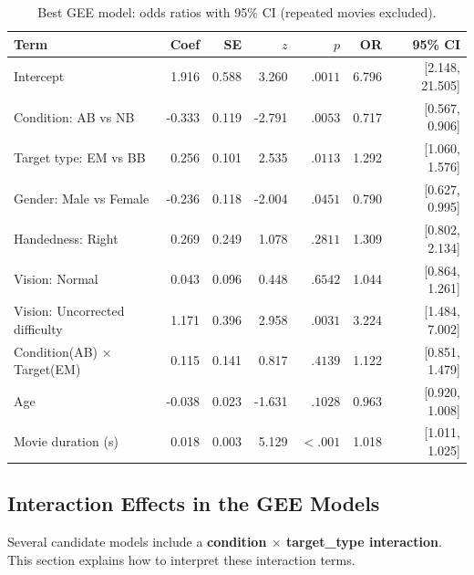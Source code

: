 \documentclass[12pt,a4paper]{article}
\begin{document}
\begin{table}[H]
\centering
\footnotesize
\begin{tabular}{lrrrrrr}
\hline
\textbf{Term} & \textbf{Coef} & \textbf{SE} & \textbf{$z$} & \textbf{$p$} & \textbf{OR} & \textbf{95\% CI} \\
\hline

    Intercept & 1.916 & 0.588 & 3.260 & $.0011$ & 6.796 & [2.148, 21.505] \\

    Condition: AB vs NB & -0.333 & 0.119 & -2.791 & $.0053$ & 0.717 & [0.567, 0.906] \\

    Target type: EM vs BB & 0.256 & 0.101 & 2.535 & $.0113$ & 1.292 & [1.060, 1.576] \\

    Gender: Male vs Female & -0.236 & 0.118 & -2.004 & $.0451$ & 0.790 & [0.627, 0.995] \\

    Handedness: Right & 0.269 & 0.249 & 1.078 & $.2811$ & 1.309 & [0.802, 2.134] \\

    Vision: Normal & 0.043 & 0.096 & 0.448 & $.6542$ & 1.044 & [0.864, 1.261] \\

    Vision: Uncorrected difficulty & 1.171 & 0.396 & 2.958 & $.0031$ & 3.224 & [1.484, 7.002] \\

    Condition(AB) $\times$ Target(EM) & 0.115 & 0.141 & 0.817 & $.4139$ & 1.122 & [0.851, 1.479] \\

    Age & -0.038 & 0.023 & -1.631 & $.1028$ & 0.963 & [0.920, 1.008] \\

    Movie duration (s) & 0.018 & 0.003 & 5.129 & $<.001$ & 1.018 & [1.011, 1.025] \\

\hline
\end{tabular}
\caption{Best GEE model: odds ratios with 95\% CI (repeated movies excluded).}
\end{table}


\subsection{Interaction Effects in the GEE Models}
\label{sec:interaction}

Several candidate models include a \textbf{condition $\times$ target\_type interaction}.
This section explains how to interpret these interaction terms.
\end{document}
